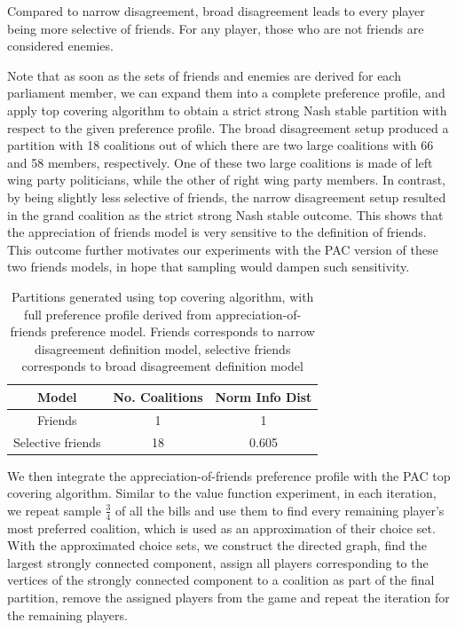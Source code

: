 \documentclass[letterpaper]{article} %
\theoremstyle{definition}
\begin{document}
Compared to narrow disagreement, broad disagreement leads to every player being more selective of friends. For any player, those who are not friends are considered enemies.

Note that as soon as the sets of friends and enemies are derived for each parliament member, we can expand them into a complete preference profile, and apply top covering algorithm to obtain a strict strong Nash stable partition with respect to the given preference profile. The broad disagreement setup produced a partition with 18 coalitions out of which there are two large coalitions with 66 and 58 members, respectively. One of these two large coalitions is made of left wing party politicians, while the other of right wing party members. In contrast, by being slightly less selective of friends, the narrow disagreement setup resulted in the grand coalition as the strict strong Nash stable outcome. This shows that the appreciation of friends model is very sensitive to the definition of friends. This outcome further motivates our experiments with the PAC version of these two friends models, in hope that sampling would dampen such sensitivity.

\begin{table}[h!]
\centering
\begin{tabular}{c|c|c}
\hline
Model & No. Coalitions & Norm Info Dist \\
\hline
Friends & 1 & 1 \\
Selective friends & 18 & 0.605 \\
\hline
\end{tabular}
\caption{Partitions generated using top covering algorithm, with full preference profile derived from appreciation-of-friends preference model. Friends corresponds to narrow disagreement definition model, selective friends corresponds to broad disagreement definition model}
\label{table:friends_models}
\end{table}

We then integrate the appreciation-of-friends preference profile with the PAC top covering algorithm. Similar to the value function experiment, in each iteration, we repeat sample $\frac{3}{4}$ of all the bills and use them to find every remaining player's most preferred coalition, which is used as an approximation of their choice set. With the approximated choice sets, we construct the directed graph, find the largest strongly connected component, assign all players corresponding to the vertices of the strongly connected component to a coalition as part of the final partition, remove the assigned players from the game and repeat the iteration for the remaining players.
\end{document}
